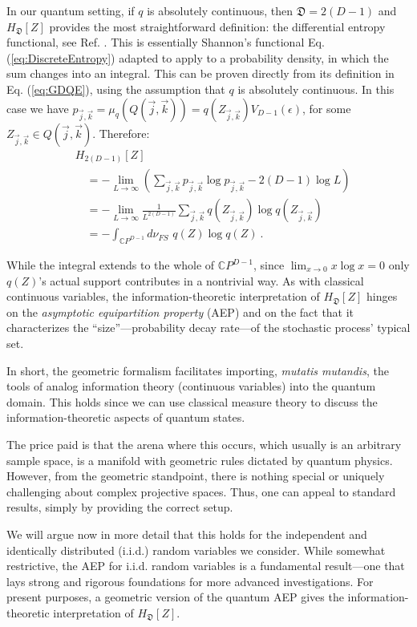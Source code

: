 \documentclass[draft,nofootinbib,pre,twocolumn,showkeys,superscriptaddress,preprintnumbers,floatfix]{revtex4-1}
\newcommand{\1}{\mathbbm{1}}
\newcommand{\CP}[1]{\mathbb{C}P^{#1}}
\newcommand{\QJK}[2]{Q( \vec{#1},\vec{#2})}
\newcommand{\DD}{\mathfrak{D}}
\newcommand{\iid}{i.i.d.\xspace}
\begin{document}
In our quantum setting, if $q$ is absolutely continuous, then $\mathfrak{D}= 2(D-1)$
and $H_{\DD}[Z]$ provides the most straightforward definition: the differential 
entropy functional, see Ref. \cite{Cove91a}. This is essentially Shannon's 
functional
Eq. (\ref{eq:DiscreteEntropy})
adapted to apply to a probability density, in which the sum changes into an integral. 
This can be proven directly from its definition in Eq. (\ref{eq:GDQE}), using the 
assumption that $q$ is absolutely continuous. In this case we have $p_{\vec{j},\vec{k}} =
\mu_q(\QJK{j}{k})=q(Z_{\vec{j},\vec{k}})V_{D-1}(\epsilon)$, for some
$Z_{\vec{j},\vec{k}} \in Q(\vec{j},\vec{k})$. Therefore:
\begin{align}
& H_{2(D-1)}\left[ Z\right] \nonumber \\
  & \quad = -\lim_{L \to \infty} \left( \sum_{\vec{j},\vec{k}}p_{\vec{j},\vec{k}} \log p_{\vec{j},\vec{k}} - 2(D-1)\log L \right)\nonumber \\
  & \quad = -\lim_{L \to \infty} \frac{1}{L^{2(D-1)}}\sum_{\vec{j},\vec{k}}q(Z_{\vec{j},\vec{k}}) \log q(Z_{\vec{j},\vec{k}}) \nonumber \\
  & \quad = -\int_{\CP{D-1}} \!\!\!\!\!\! d\nu_{FS} \,\, q(Z) \log q(Z)
  ~.
\label{eq:StSpAverage}
\end{align}

While the integral extends to the whole of $\CP{D-1}$, since $\lim_{x \to 0} x
\log x = 0$ only $q(Z)$'s actual support contributes in a nontrivial way.  As
with classical continuous variables, the information-theoretic interpretation
of $H_{\DD}[Z]$ hinges on the \emph{asymptotic equipartition property} (AEP)
and on the fact that it characterizes the ``size''---probability decay rate---of
the stochastic process' typical set.

In short, the geometric formalism facilitates importing, \emph{mutatis
mutandis}, the tools of analog information theory (continuous variables)
into the quantum domain. This holds since we can use classical measure theory
to discuss the information-theoretic aspects of quantum states.

The price paid is that the arena where this occurs, which usually is an
arbitrary sample space, is a manifold with geometric rules dictated by quantum
physics. However, from the geometric standpoint, there is nothing special or
uniquely challenging about complex projective spaces. Thus, one can appeal to
standard results, simply by providing the correct setup.

We will argue now in more detail that this holds for the independent and
identically distributed (\iid) random variables we consider. While somewhat
restrictive, the AEP for \iid random variables is a fundamental result---one
that lays strong and rigorous foundations for more advanced investigations. For
present purposes, a geometric version of the quantum AEP gives the
information-theoretic interpretation of $H_{\mathfrak{D}}[Z]$.
\end{document}
